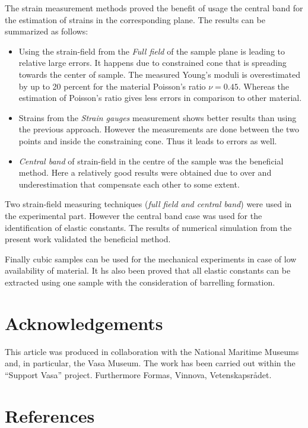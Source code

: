 \documentclass[3p]{elsarticle}
\begin{document}
The strain measurement methods proved the benefit of usage the central band for
the estimation of strains in the corresponding plane. The results can be summarized as follows:

\begin{itemize}
  \item Using the strain-field from the \textit{Full field} of the sample plane
  is leading to relative large errors. It happens due to constrained cone that is spreading towards the center  of sample.
  The measured Young's moduli is overestimated by up to 20 percent for the
  material Poisson's ratio $\nu=0.45$. Whereas the estimation of Poisson's ratio
  gives less errors in comparison to other material.
  \item Strains from the \textit{Strain gauges} measurement shows better results than using the previous approach. However the measurements are done between the two points and inside the constraining cone. Thus it leads to errors as well.
  \item  \textit{Central band} of strain-field in the centre of the sample was
  the beneficial method. Here a relatively good results were obtained due to over and underestimation that compensate each other to some extent.
\end{itemize}

Two strain-field measuring techniques (\textit{full field and central band})
were used in the experimental part. However the central band case was used
for the identification of elastic constants. The results of numerical simulation
from the present work validated the beneficial method.\par Finally cubic samples
can be used for the mechanical experiments in case of low availability of
material. It hs also been proved that all elastic constants can be extracted
using one sample with the consideration of barrelling formation.


\section*{Acknowledgements}
This article was produced in collaboration with the National Maritime Museums
and, in particular, the Vasa Museum. The work has been carried
out within the ``Support Vasa'' project. Furthermore  Formas, Vinnova,
Vetenskapsr{\aa}det. \section*{References}

\end{document}
